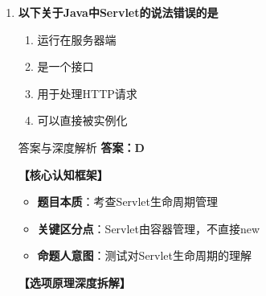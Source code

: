 \documentclass[12pt, a4paper]{ctexart}
\begin{document}
\begin{enumerate}[label=\textbf{\arabic*.}]
\begin{bluebox}{答案与深度解析}
\begin{itemize}[label={}, leftmargin=*, nosep]
		      \item \textbf{D. getProtocolType() — 错误}
		      \begin{itemize}[label={}, leftmargin=*, nosep]
			      \item \textbf{辨析}：不存在此方法
		      \end{itemize}

		      \end{itemize}

		      \textbf{【应背诵知识点（命题人思维版）】}
		      \begin{enumerate}[leftmargin=*, nosep]
			      \item \textbf{记忆技巧}：URL遵循URI规范，用scheme表示协议
		      \end{enumerate}

		      \textbf{【命题趋势与实战策略】}

		      \textbf{考场秒杀技巧}：URL获取协议用getScheme()
	      \end{bluebox}

	\item \textbf{以下关于Java中Servlet的说法错误的是}
	      \begin{enumerate}[label=\Alph*.]
		      \item 运行在服务器端
		      \item 是一个接口
		      \item 用于处理HTTP请求
		      \item 可以直接被实例化
	      \end{enumerate}

	      \begin{bluebox}{答案与深度解析}
		      \textbf{答案：D}

		      \textbf{【核心认知框架】}
		      \begin{itemize}[label={}, leftmargin=*, nosep]
			      \item \textbf{题目本质}：考查Servlet生命周期管理
			      \item \textbf{关键区分点}：Servlet由容器管理，不直接new
			      \item \textbf{命题人意图}：测试对Servlet生命周期的理解
		      \end{itemize}

		      \textbf{【选项原理深度拆解】}
					  \begin{itemize}[label={}, leftmargin=*, nosep]


\end{itemize}
\end{bluebox}
\end{enumerate}
\end{document}
